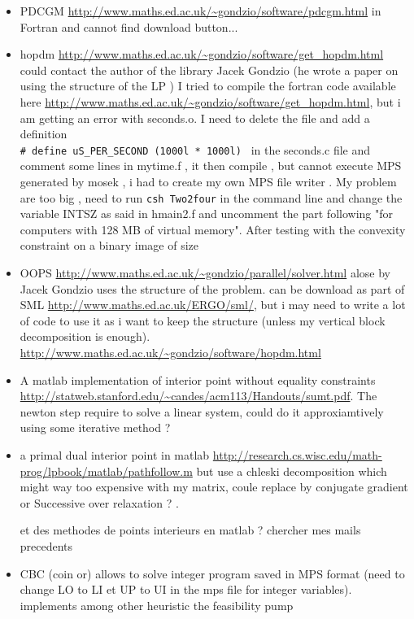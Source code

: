 \documentclass[11pt]{article}
\begin{document}
\begin{itemize}
\item PDCGM 
\url{http://www.maths.ed.ac.uk/~gondzio/software/pdcgm.html}
in Fortran and cannot find download button...
\item hopdm \url{http://www.maths.ed.ac.uk/~gondzio/software/get_hopdm.html}
could contact the author of the library Jacek Gondzio (he wrote a paper on using the structure of the LP \cite{Gondzio2003})
I tried to compile the fortran code available here \url{http://www.maths.ed.ac.uk/~gondzio/software/get_hopdm.html}, but i am getting an error with seconds.o. I need to delete the file and add a definition\\ \verb!# define uS_PER_SECOND (1000l * 1000l) ! in the seconds.c file and comment some lines in mytime.f , it then compile , but cannot execute MPS generated by mosek , i had to create my own MPS file writer . My problem are too big , need to run  \verb!csh Two2four! in the command line and change the variable INTSZ as said in hmain2.f and uncomment the part following "for computers with  128 MB of virtual memory". After testing with the convexity constraint on a binary image of size 
\item OOPS
\url{http://www.maths.ed.ac.uk/~gondzio/parallel/solver.html}
alose by Jacek Gondzio uses the structure of the problem.
can be download as part of SML \url{http://www.maths.ed.ac.uk/ERGO/sml/}, but i may need to write a lot of code to use it as i want to keep the structure (unless my vertical block decomposition is enough). 
\url{http://www.maths.ed.ac.uk/~gondzio/software/hopdm.html}
\item A matlab implementation of interior point without equality constraints \url{http://statweb.stanford.edu/~candes/acm113/Handouts/sumt.pdf}. The newton step require to solve a linear system, could do it approxiamtively using some iterative method ? 
\item a primal dual interior point in matlab \url{http://research.cs.wisc.edu/math-prog/lpbook/matlab/pathfollow.m}
but use a chleski decomposition which might way too expensive with my matrix, coule replace by conjugate gradient or Successive over relaxation ? .

et des methodes de points interieurs en matlab ? chercher mes mails precedents

\item CBC (coin or) allows to solve integer program saved in MPS format (need to change LO to LI et UP to UI in the mps file for integer variables). implements among other heuristic the feasibility pump

\end{itemize}
\end{document}
